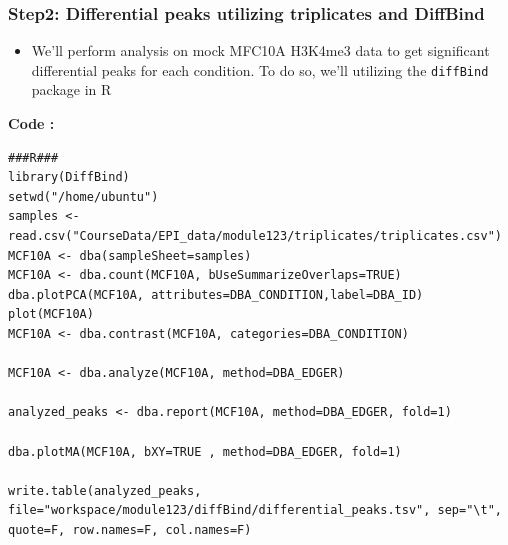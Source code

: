 \documentclass[
]{book}
\providecommand{\tightlist}{%
  \setlength{\itemsep}{0pt}\setlength{\parskip}{0pt}}
\begin{document}
\subsubsection{Step2: Differential peaks utilizing triplicates and DiffBind}\label{step2-differential-peaks-utilizing-triplicates-and-diffbind}

\begin{itemize}
\tightlist
\item
  We'll perform analysis on mock MFC10A H3K4me3 data to get significant differential peaks for each condition. To do so, we'll utilizing the \texttt{diffBind} package in R
\end{itemize}

\textbf{Code :}

\begin{verbatim}
###R###
library(DiffBind)
setwd("/home/ubuntu")
samples <- read.csv("CourseData/EPI_data/module123/triplicates/triplicates.csv")
MCF10A <- dba(sampleSheet=samples)
MCF10A <- dba.count(MCF10A, bUseSummarizeOverlaps=TRUE)
dba.plotPCA(MCF10A, attributes=DBA_CONDITION,label=DBA_ID)
plot(MCF10A)
MCF10A <- dba.contrast(MCF10A, categories=DBA_CONDITION)

MCF10A <- dba.analyze(MCF10A, method=DBA_EDGER)

analyzed_peaks <- dba.report(MCF10A, method=DBA_EDGER, fold=1)

dba.plotMA(MCF10A, bXY=TRUE , method=DBA_EDGER, fold=1)

write.table(analyzed_peaks, file="workspace/module123/diffBind/differential_peaks.tsv", sep="\t", quote=F, row.names=F, col.names=F)
\end{verbatim}
\end{document}
